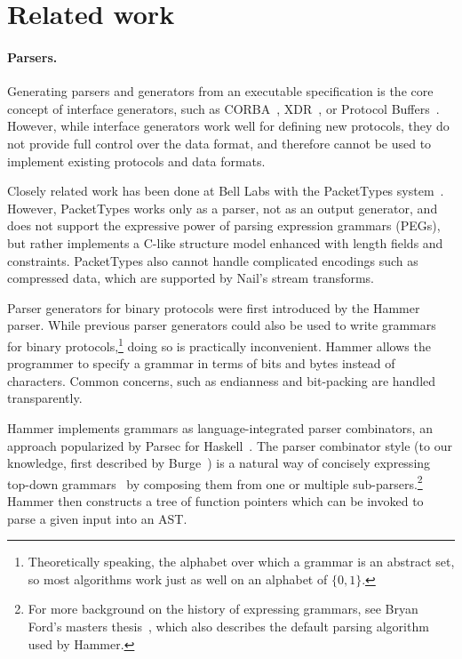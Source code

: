 \section{Related work}
\label{s:relwk}

\paragraph{Parsers.}

Generating parsers and generators from an executable specification is the
core concept of interface generators, such as CORBA~\cite{omg:corba},
XDR~\cite{rfc:1832}, or Protocol Buffers~\cite{varda2008}.  However,
while interface generators work well for defining new protocols, they
do not provide full control over the data format, and therefore cannot
be used to implement existing protocols and data formats.

Closely related work has been done at Bell Labs with the PacketTypes
system~\cite{mccann2000packet}.  However, PacketTypes works only as a
parser, not as an output generator, and does not support the expressive
power of parsing expression grammars (PEGs), but rather implements a
C-like structure model enhanced with length fields and constraints.
PacketTypes also cannot handle complicated encodings such as compressed
data, which are supported by Nail's stream transforms.

Parser generators for binary protocols were first introduced by the
Hammer~\cite{hammer-parser} parser.
While previous parser generators could also be used to write grammars
for binary protocols,\footnote{Theoretically speaking, the alphabet
over which a grammar is an abstract set, so most algorithms work
just as well on an alphabet of $\{0,1\}$.} doing so is practically
inconvenient. Hammer allows the programmer to specify a grammar in
terms of bits and bytes instead of characters. Common concerns, such as
endianness and bit-packing are handled transparently. 

Hammer implements grammars as language-integrated parser combinators, an approach popularized by
Parsec for Haskell~\cite{LeijenMeijer:parsec}. The parser combinator style (to our knowledge, first
described by Burge~\cite{burge1975recursive}) is a natural way of concisely expressing top-down
grammars~\cite{Danielsson:2010:TPC:1863543.1863585}
by composing them from one or multiple sub-parsers.\footnote{For more
background on the history of expressing grammars, see Bryan Ford's
masters thesis~\cite{ford2002packrat}, which also describes the
default parsing algorithm used by Hammer.}
Hammer then constructs a tree of function pointers which can be invoked to parse a given input into
an AST\@.


